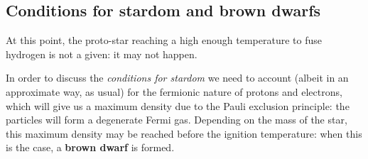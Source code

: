 \documentclass[main.tex]{subfiles}
\begin{document}
\subsection{Conditions for stardom and brown dwarfs}








At this point, the proto-star reaching a high enough temperature to fuse hydrogen is not a given: it may not happen. 

In order to discuss the \emph{conditions for stardom} we need to account (albeit in an approximate way, as usual) for the fermionic nature of protons and electrons, which will give us a maximum density due to the Pauli exclusion principle: the particles will form a degenerate Fermi gas. 
Depending on the mass of the star, this maximum density may be reached before the ignition temperature: when this is the case, a \textbf{brown dwarf} is formed.
\end{document}
